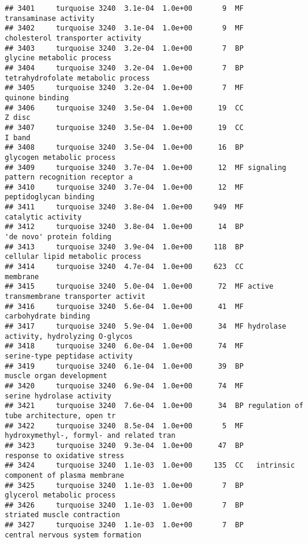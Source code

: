 \documentclass[]{article}
\begin{document}
\begin{verbatim}
## 3401     turquoise 3240  3.1e-04  1.0e+00       9  MF                    transaminase activity
## 3402     turquoise 3240  3.1e-04  1.0e+00       9  MF         cholesterol transporter activity
## 3403     turquoise 3240  3.2e-04  1.0e+00       7  BP                glycine metabolic process
## 3404     turquoise 3240  3.2e-04  1.0e+00       7  BP       tetrahydrofolate metabolic process
## 3405     turquoise 3240  3.2e-04  1.0e+00       7  MF                          quinone binding
## 3406     turquoise 3240  3.5e-04  1.0e+00      19  CC                                   Z disc
## 3407     turquoise 3240  3.5e-04  1.0e+00      19  CC                                   I band
## 3408     turquoise 3240  3.5e-04  1.0e+00      16  BP               glycogen metabolic process
## 3409     turquoise 3240  3.7e-04  1.0e+00      12  MF signaling pattern recognition receptor a
## 3410     turquoise 3240  3.7e-04  1.0e+00      12  MF                    peptidoglycan binding
## 3411     turquoise 3240  3.8e-04  1.0e+00     949  MF                       catalytic activity
## 3412     turquoise 3240  3.8e-04  1.0e+00      14  BP                'de novo' protein folding
## 3413     turquoise 3240  3.9e-04  1.0e+00     118  BP         cellular lipid metabolic process
## 3414     turquoise 3240  4.7e-04  1.0e+00     623  CC                                 membrane
## 3415     turquoise 3240  5.0e-04  1.0e+00      72  MF active transmembrane transporter activit
## 3416     turquoise 3240  5.6e-04  1.0e+00      41  MF                     carbohydrate binding
## 3417     turquoise 3240  5.9e-04  1.0e+00      34  MF hydrolase activity, hydrolyzing O-glycos
## 3418     turquoise 3240  6.0e-04  1.0e+00      74  MF           serine-type peptidase activity
## 3419     turquoise 3240  6.1e-04  1.0e+00      39  BP                 muscle organ development
## 3420     turquoise 3240  6.9e-04  1.0e+00      74  MF                serine hydrolase activity
## 3421     turquoise 3240  7.6e-04  1.0e+00      34  BP regulation of tube architecture, open tr
## 3422     turquoise 3240  8.5e-04  1.0e+00       5  MF hydroxymethyl-, formyl- and related tran
## 3423     turquoise 3240  9.3e-04  1.0e+00      47  BP             response to oxidative stress
## 3424     turquoise 3240  1.1e-03  1.0e+00     135  CC   intrinsic component of plasma membrane
## 3425     turquoise 3240  1.1e-03  1.0e+00       7  BP               glycerol metabolic process
## 3426     turquoise 3240  1.1e-03  1.0e+00       7  BP              striated muscle contraction
## 3427     turquoise 3240  1.1e-03  1.0e+00       7  BP         central nervous system formation

\end{verbatim}
\end{document}
